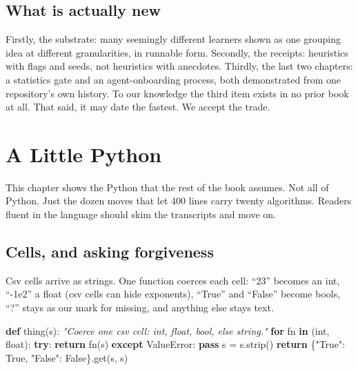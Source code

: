 \documentclass[
  justified]{tufte-book}
\newenvironment{Shaded}{}{}
\newcommand{\BuiltInTok}[1]{\textcolor[rgb]{0.00,0.50,0.00}{#1}}
\newcommand{\CommentTok}[1]{\textcolor[rgb]{0.38,0.63,0.69}{\textit{#1}}}
\newcommand{\ControlFlowTok}[1]{\textcolor[rgb]{0.00,0.44,0.13}{\textbf{#1}}}
\newcommand{\KeywordTok}[1]{\textcolor[rgb]{0.00,0.44,0.13}{\textbf{#1}}}
\newcommand{\NormalTok}[1]{#1}
\newcommand{\OperatorTok}[1]{\textcolor[rgb]{0.40,0.40,0.40}{#1}}
\newcommand{\PreprocessorTok}[1]{\textcolor[rgb]{0.74,0.48,0.00}{#1}}
\newcommand{\StringTok}[1]{\textcolor[rgb]{0.25,0.44,0.63}{#1}}
\newcommand{\VariableTok}[1]{\textcolor[rgb]{0.10,0.09,0.49}{#1}}
\begin{document}
\section{What is actually new}\label{what-is-actually-new}

Firstly, the substrate: many seemingly different learners shown as one
grouping idea at different granularities, in runnable form. Secondly,
the receipts: heuristics with flags and seeds, not heuristics with
anecdotes. Thirdly, the last two chapters: a statistics gate and an
agent-onboarding process, both demonstrated from one repository's own
history. To our knowledge the third item exists in no prior book at all.
That said, it may date the fastest. We accept the trade.

\chapter{A Little Python}\label{a-little-python}

This chapter shows the Python that the rest of the book assumes. Not all
of Python. Just the dozen moves that let 400 lines carry twenty
algorithms. Readers fluent in the language should skim the transcripts
and move on.

\section{Cells, and asking
forgiveness}\label{cells-and-asking-forgiveness}

Csv cells arrive as strings. One function coerces each cell: ``23''
becomes an int, ``-1e2'' a float (csv cells can hide exponents),
``True'' and ``False'' become bools, ``?'' stays as our mark for
missing, and anything else stays text.

\begin{Shaded}
\begin{Highlighting}[]
\KeywordTok{def}\NormalTok{ thing(s):}
  \CommentTok{"Coerce one csv cell: int, float, bool, else string."}
  \ControlFlowTok{for}\NormalTok{ fn }\KeywordTok{in}\NormalTok{ (}\BuiltInTok{int}\NormalTok{, }\BuiltInTok{float}\NormalTok{):}
    \ControlFlowTok{try}\NormalTok{: }\ControlFlowTok{return}\NormalTok{ fn(s)}
    \ControlFlowTok{except} \PreprocessorTok{ValueError}\NormalTok{: }\ControlFlowTok{pass}
\NormalTok{  s }\OperatorTok{=}\NormalTok{ s.strip()}
  \ControlFlowTok{return}\NormalTok{ \{}\StringTok{"True"}\NormalTok{: }\VariableTok{True}\NormalTok{, }\StringTok{"False"}\NormalTok{: }\VariableTok{False}\NormalTok{\}.get(s, s)}
\end{Highlighting}
\end{Shaded}
\end{document}
